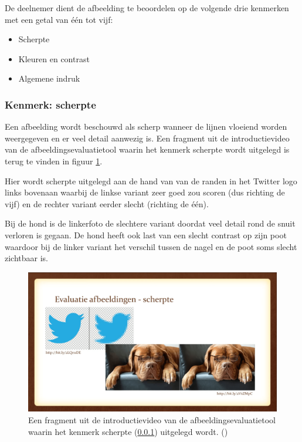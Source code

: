 De deelnemer dient de afbeelding te beoordelen op de volgende drie kenmerken met een getal van één tot vijf:

\begin{itemize}
	\item Scherpte
	\item Kleuren en contrast
	\item Algemene indruk
\end{itemize}

\subsubsection{Kenmerk: scherpte}
\label{sec:onderzoek-evaluatietool-verloop-beoordeling-scherpte}

Een afbeelding wordt beschouwd als scherp wanneer de lijnen vloeiend worden weergegeven en er veel detail aanwezig is. Een fragment uit de introductievideo van de \gls{afbeeldingsevaluatietool} waarin het kenmerk scherpte wordt uitgelegd is terug te vinden in figuur \ref{fig:kenmerk-scherpte}.

Hier wordt scherpte uitgelegd aan de hand van van de randen in het Twitter logo links bovenaan waarbij de linkse variant zeer goed zou scoren (dus richting de vijf) en de rechter variant eerder slecht (richting de één).

Bij de hond is de linkerfoto de slechtere variant doordat veel detail rond de snuit verloren is gegaan. De hond heeft ook last van een slecht contrast op zijn poot waardoor bij de linker variant het verschil tussen de nagel en de poot soms slecht zichtbaar is.

\begin{figure}
	\includegraphics[width=\linewidth]{img/onderzoek/scherpte.png}
	\caption{Een fragment uit de introductievideo van de \gls{afbeeldingsevaluatietool} waarin het kenmerk scherpte (\ref{sec:onderzoek-evaluatietool-verloop-beoordeling-scherpte}) uitgelegd wordt. (\cite{introductievideo})}
	\label{fig:kenmerk-scherpte}
\end{figure}

